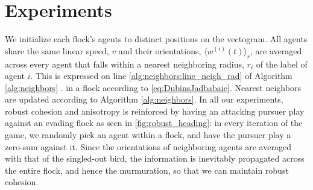 \section{Experiments}
\label{sec:expts}
%
We initialize each flock's agents to distinct positions on the vectogram. All agents share the same linear speed, $v$ and their orientations, $\langle w^{(i)} (t) \rangle_r$, are averaged  across every agent that falls within a nearest neighboring radius, $r_i$ of the label of agent $i$. This is expressed on line \ref{alg:neighbors:line_neigh_rad} of Algorithm \ref{alg:neighbors} . in a flock according to \eqref{eq:DubinsJadbabaie}. Nearest neighbors are updated according to Algorithm \ref{alg:neighbors}. In all our experiments, robust cohesion and anisotropy is reinforced by having an attacking  pursuer play against an evading flock as seen in \autoref{fig:robust_heading}: in every iteration of the game, we randomly pick an agent within a flock, and have the pursuer play a zero-sum against it. Since the orientations of neighboring agents are averaged with that of the singled-out bird, the information is inevitably propagated across the entire flock, and hence the murmuration, so that we can maintain robust cohesion.
%

